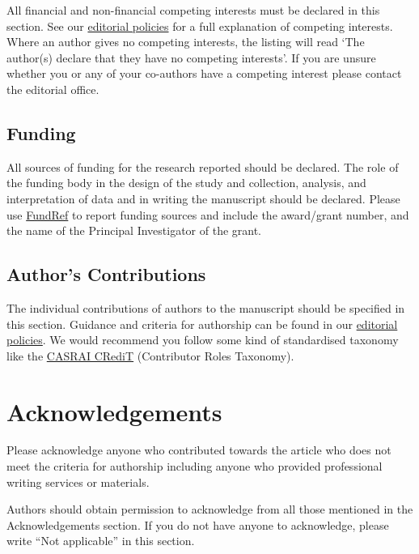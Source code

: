 \documentclass[a4paper,alpha-refs]{aejstyles}
\begin{document}
All financial and non-financial competing interests must be declared in this section. See our \href{https://academic.oup.com/Astronomy Education Journal/pages/editorial_policies_and_reporting_standards}{editorial policies} for a full explanation of competing interests. Where an author gives no competing interests, the listing will read `The author(s) declare that they have no competing interests'. If you are unsure whether you or any of your co-authors have a competing interest please contact the editorial office.


\subsection{Funding}

All sources of funding for the research reported should be declared. The role of the funding body in the design of the study and collection, analysis, and interpretation of data and in writing the manuscript should be declared. Please use \href{http://www.crossref.org/fundingdata/}{FundRef} to report funding sources and include the award/grant number, and the name of the Principal Investigator of the grant. 


\subsection{Author's Contributions}

The individual contributions of authors to the manuscript should be specified in this section. Guidance and criteria for authorship can be found in our \href{https://academic.oup.com/Astronomy Education Journal/pages/editorial_policies_and_reporting_standards}{editorial policies}. We would recommend you follow some kind of standardised taxonomy like the \href{http://docs.casrai.org/CRediT}{CASRAI CRediT} (Contributor Roles Taxonomy).


\section{Acknowledgements}

Please acknowledge anyone who contributed towards the article who does not meet the criteria for authorship including anyone who provided professional writing services or materials.

Authors should obtain permission to acknowledge from all those mentioned in the Acknowledgements section. If you do not have anyone to acknowledge, please write ``Not applicable'' in this section.
\end{document}
